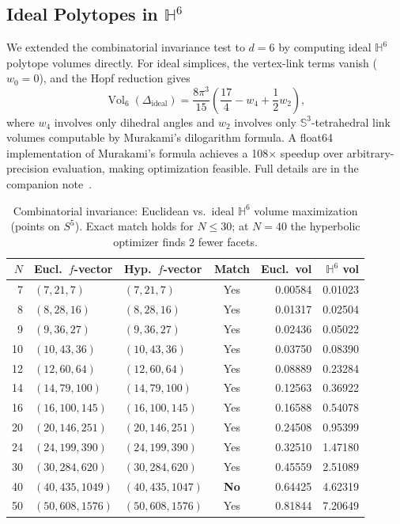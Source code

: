 \documentclass[11pt]{article}
\begin{document}
\subsection{Ideal Polytopes in $\mathbb{H}^6$}

We extended the combinatorial invariance test to $d = 6$ by computing
ideal $\mathbb{H}^6$ polytope volumes directly.  For ideal simplices,
the vertex-link terms vanish ($w_0 = 0$), and the Hopf reduction gives
\[
\operatorname{Vol}_6(\Delta_{\mathrm{ideal}})
= \frac{8\pi^3}{15}\left(\frac{17}{4} - w_4 + \frac{1}{2}w_2\right),
\]
where $w_4$ involves only dihedral angles and $w_2$ involves only
$\mathbb{S}^3$-tetrahedral link volumes computable by Murakami's
dilogarithm formula.  A float64 implementation of Murakami's formula
achieves a 108$\times$ speedup over arbitrary-precision evaluation,
making optimization feasible.  Full details are in the companion
note~\cite{H56note}.

\begin{table}[ht]
\centering
\caption{Combinatorial invariance: Euclidean vs.\ ideal $\mathbb{H}^6$
volume maximization (points on $S^5$).  Exact match holds for $N \leq 30$;
at $N = 40$ the hyperbolic optimizer finds $2$ fewer facets.}
\label{tab:comb_H6}
\smallskip
\begin{tabular}{r l l c r r}
\toprule
$N$ & Eucl.\ $f$-vector & Hyp.\ $f$-vector & Match & Eucl.\ vol & $\mathbb{H}^6$ vol \\
\midrule
7  & $(7,21,7)$       & $(7,21,7)$       & Yes & 0.00584 & 0.01023 \\
8  & $(8,28,16)$      & $(8,28,16)$      & Yes & 0.01317 & 0.02504 \\
9  & $(9,36,27)$      & $(9,36,27)$      & Yes & 0.02436 & 0.05022 \\
10 & $(10,43,36)$     & $(10,43,36)$     & Yes & 0.03750 & 0.08390 \\
12 & $(12,60,64)$     & $(12,60,64)$     & Yes & 0.08889 & 0.23284 \\
14 & $(14,79,100)$    & $(14,79,100)$    & Yes & 0.12563 & 0.36922 \\
16 & $(16,100,145)$   & $(16,100,145)$   & Yes & 0.16588 & 0.54078 \\
20 & $(20,146,251)$   & $(20,146,251)$   & Yes & 0.24508 & 0.95399 \\
24 & $(24,199,390)$   & $(24,199,390)$   & Yes & 0.32510 & 1.47180 \\
30 & $(30,284,620)$   & $(30,284,620)$   & Yes & 0.45559 & 2.51089 \\
\midrule
40 & $(40,435,1049)$  & $(40,435,1047)$  & \textbf{No} & 0.64425 & 4.62319 \\
50 & $(50,608,1576)$  & $(50,608,1576)$  & Yes & 0.81844 & 7.20649 \\
\bottomrule
\end{tabular}
\end{table}
\end{document}
